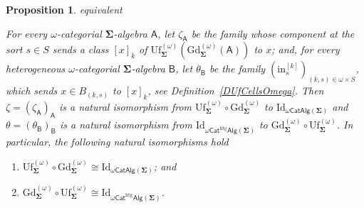 \documentclass[a4paper, reqno]{amsbook}
\makeatletter
\newcommand{\sig}[1]{\mathbf{#1}}             %
\newcommand{\calg}[1]{\boldsymbol{\mathsf{#1}}} %
\newcommand{\htg}{\mathrm{htg}}                %
\newcommand{\Id}{\mathrm{Id}}
\newcommand{\Gd}{\mathrm{Gd}}
\newcommand{\Uf}{\mathrm{Uf}}
\theoremstyle{plain}
\newtheorem{proposition}[theorem]{Proposition}
\theoremstyle{definition}
\newcommand*{\CA@leanpending}{}
\newcommand*{\CA@leanrelation}{}
\newcommand*{\lean}[2]{%
  \ifcsname\string\color@lean@#1\endcsname\else
    \PackageError{main}{Unknown relation `#1' in \string\lean}{Use equivalent, weaker or stronger.}%
  \fi
  \gdef\CA@leanrelation{#1}%
  \gdef\CA@leanpending{#2}}
\makeatother
\begin{document}
\begin{proposition}\label{PGdUfIsoOmega}\lean{equivalent}{Omega.zeta,Omega.theta}
For every $\omega$-categorial $\sig{\Sigma}$-algebra $\calg{A}$, let $\zeta_{\calg{A}}$ be the family whose component at the sort $s\in S$ sends a class $[x]_{k}$ of $\Uf^{(\omega)}_{\sig{\Sigma}}(\Gd^{(\omega)}_{\sig{\Sigma}}(\calg{A}))$ to $x$; and, for every heterogeneous $\omega$-categorial $\sig{\Sigma}$-algebra $\calg{B}$, let $\theta_{\calg{B}}$ be the family $(\mathrm{in}^{[k]}_{s})_{(k,s)\in\omega\times S}$, which sends $x\in B_{(k,s)}$ to $[x]_{k}$, see Definition~\ref{DUfCellsOmega}.
Then $\zeta=(\zeta_{\calg{A}})_{\calg{A}}$ is a natural isomorphism from $\Uf^{(\omega)}_{\sig{\Sigma}}\circ\Gd^{(\omega)}_{\sig{\Sigma}}$ to $\Id_{\omega\mathsf{CatAlg}(\sig{\Sigma})}$ and $\theta=(\theta_{\calg{B}})_{\calg{B}}$ is a natural isomorphism from $\Id_{\omega\mathsf{Cat}^{\htg}\mathsf{Alg}(\sig{\Sigma})}$ to $\Gd^{(\omega)}_{\sig{\Sigma}}\circ\Uf^{(\omega)}_{\sig{\Sigma}}$.
In particular, the following natural isomorphisms hold
\begin{enumerate}
	\item
	$\Uf^{(\omega)}_{\sig{\Sigma}}\circ\Gd^{(\omega)}_{\sig{\Sigma}}\cong\Id_{\omega\mathsf{CatAlg}(\sig{\Sigma})}$; and

	\item
	$\Gd^{(\omega)}_{\sig{\Sigma}}\circ\Uf^{(\omega)}_{\sig{\Sigma}}\cong\Id_{\omega\mathsf{Cat}^{\htg}\mathsf{Alg}(\sig{\Sigma})}$.
\end{enumerate}
\end{proposition}
\end{document}
